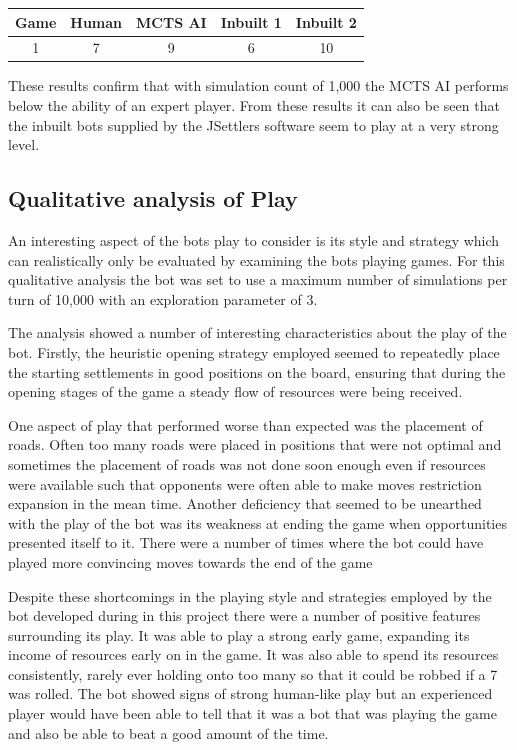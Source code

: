 \documentclass[]{article}
\begin{document}
\begin{center}
\begin{tabular}{|c||c|c|c|c|}
\hline
Game & Human & MCTS AI & Inbuilt 1 & Inbuilt 2\\
\hline
1 & 7 & 9 & 6 & 10\\
\hline
\end{tabular}
\end{center}

These results confirm that with simulation count of 1,000 the MCTS AI performs below the ability of an expert player. From these results it can also be seen that the inbuilt bots supplied by the JSettlers software seem to play at a very strong level. 


\subsection{Qualitative analysis of Play}
An interesting aspect of the bots play to consider is its style and strategy which can realistically only be evaluated by examining the bots playing games. For this qualitative analysis the bot was set to use a maximum number of simulations per turn of 10,000 with an exploration parameter of 3.

\par The analysis showed a number of interesting characteristics about the play of the bot. Firstly, the heuristic opening strategy employed seemed to repeatedly place the starting settlements in good positions on the board, ensuring that during the opening stages of the game a steady flow of resources were being received.

\par One aspect of play that performed worse than expected was the placement of roads. Often too many roads were placed in positions that were not optimal and sometimes the placement of roads was not done soon enough even if resources were available such that opponents were often able to make moves restriction expansion in the mean time. Another deficiency that seemed to be unearthed with the play of the bot was its weakness at ending the game when opportunities presented itself to it. There were a number of times where the bot could have played more convincing moves towards the end of the game

\par Despite these shortcomings in the playing style and strategies employed by the bot developed during in this project there were a number of positive features surrounding its play. It was able to play a strong early game, expanding its income of resources early on in the game. It was also able to spend its resources consistently, rarely ever holding onto too many so that it could be robbed if a 7 was rolled. The bot showed signs of strong human-like play but an experienced player would have been able to tell that it was a bot that was playing the game and also be able to beat a good amount of the time.
\end{document}
